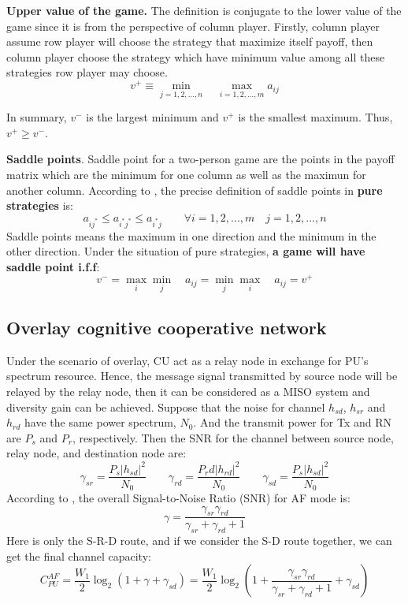 \documentclass[journal]{IEEEtran}
\begin{document}
\textbf{Upper value of the game.} The definition is conjugate to the lower value of the game since it is from the perspective of column player. Firstly, column player assume row player will choose the strategy that maximize itself payoff, then column player choose the strategy which have minimum value among all these strategies row player may choose.
\begin{equation}
  v^+ \equiv \min \limits_{j=1,2,...,n} \quad \max \limits_{i=1,2,...,m}  a_{ij}
\end{equation}


In summary, $v^-$ is the largest minimum and $v^+$ is the smallest maximum. Thus, $v^+ \geqslant v^-$.


\textbf{Saddle points}. Saddle point for a two-person game are the points in the payoff matrix which are the minimum for one column as well as the maximun for another column. According to \cite{barron2013game}, the precise definition of saddle points in \textbf{pure strategies} is:
\begin{equation}
  a_{ij^*} \leqslant a_{i^*j^*} \leqslant a_{i^*j} \qquad \forall i = 1,2,...,m \quad j = 1,2,...,n
\end{equation}
Saddle points means the maximum in one direction and the minimum in the other direction. Under the situation of pure strategies, \textbf{a game will have saddle point i.f.f}:
\begin{equation}
  v^- = \max \limits_{i} \min \limits_{j} \quad a_{ij} = \min \limits_{j} \max \limits_{i} \quad a_{ij} = v^+
\end{equation}

\subsection{Overlay cognitive cooperative network}
Under the scenario of overlay, CU act as a relay node in exchange for PU's spectrum resource. Hence, the message signal transmitted by source node will be relayed by the relay node, then it can be considered as a MISO system and diversity gain can be achieved. Suppose that the noise for channel $h_{sd}$, $h_{sr}$ and $h_{rd}$ have the same power spectrum, $N_0$. And the transmit power for Tx and RN are $P_s$ and $P_r$, respectively. Then the SNR for the channel between source node, relay node, and destination node are:
\begin{equation}
 \gamma_{sr} = \frac{P_s|h_{sd}|^2}{N_0} \qquad \gamma_{rd} = \frac{P_rd|h_{rd}|^2}{N_0} \qquad \gamma_{sd} = \frac{P_s|h_{sd}|^2}{N_0}
\end{equation}
According to \cite{hasna2003end}, the overall Signal-to-Noise Ratio (SNR) for AF mode is:
\begin{equation}
\gamma = \frac{\gamma_{sr}\gamma_{rd}}{\gamma_{sr}+\gamma_{rd}+1}
\end{equation}
Here is only the S-R-D route, and if we consider the S-D route together, we can get the final channel capacity:
\begin{equation}
C_{PU}^{AF}  = \frac{W_1}{2} \log_2(1 + \gamma + \gamma_{sd}) = \frac{W_1}{2} \log_2(1 + \frac{\gamma_{sr}\gamma_{rd}}{\gamma_{sr}+\gamma_{rd}+1} + \gamma_{sd})
\end{equation}
\end{document}
